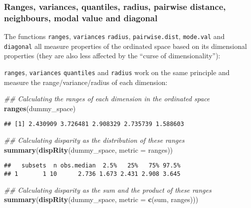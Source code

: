 \documentclass[
]{book}
\newenvironment{Shaded}{\begin{snugshade}}{\end{snugshade}}
\newcommand{\CommentTok}[1]{\textcolor[rgb]{0.56,0.35,0.01}{\textit{#1}}}
\newcommand{\DataTypeTok}[1]{\textcolor[rgb]{0.13,0.29,0.53}{#1}}
\newcommand{\KeywordTok}[1]{\textcolor[rgb]{0.13,0.29,0.53}{\textbf{#1}}}
\newcommand{\NormalTok}[1]{#1}
\begin{document}
\hypertarget{ranges-variances-quantiles-radius-pairwise-distance-neighbours-modal-value-and-diagonal}{%
\subsubsection{Ranges, variances, quantiles, radius, pairwise distance, neighbours, modal value and diagonal}\label{ranges-variances-quantiles-radius-pairwise-distance-neighbours-modal-value-and-diagonal}}

The functions \texttt{ranges}, \texttt{variances} \texttt{radius}, \texttt{pairwise.dist}, \texttt{mode.val} and \texttt{diagonal} all measure properties of the ordinated space based on its dimensional properties (they are also less affected by the ``curse of dimensionality''):

\texttt{ranges}, \texttt{variances} \texttt{quantiles} and \texttt{radius} work on the same principle and measure the range/variance/radius of each dimension:

\begin{Shaded}
\begin{Highlighting}[]
\CommentTok{\#\# Calculating the ranges of each dimension in the ordinated space}
\KeywordTok{ranges}\NormalTok{(dummy\_space)}
\end{Highlighting}
\end{Shaded}

\begin{verbatim}
## [1] 2.430909 3.726481 2.908329 2.735739 1.588603
\end{verbatim}

\begin{Shaded}
\begin{Highlighting}[]
\CommentTok{\#\# Calculating disparity as the distribution of these ranges}
\KeywordTok{summary}\NormalTok{(}\KeywordTok{dispRity}\NormalTok{(dummy\_space, }\DataTypeTok{metric =}\NormalTok{ ranges))}
\end{Highlighting}
\end{Shaded}

\begin{verbatim}
##   subsets  n obs.median  2.5%   25%   75% 97.5%
## 1       1 10      2.736 1.673 2.431 2.908 3.645
\end{verbatim}

\begin{Shaded}
\begin{Highlighting}[]
\CommentTok{\#\# Calculating disparity as the sum and the product of these ranges}
\KeywordTok{summary}\NormalTok{(}\KeywordTok{dispRity}\NormalTok{(dummy\_space, }\DataTypeTok{metric =} \KeywordTok{c}\NormalTok{(sum, ranges)))}
\end{Highlighting}
\end{Shaded}
\end{document}
